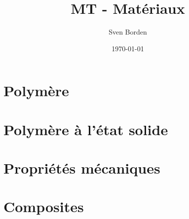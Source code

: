 \documentclass[12pt]{report}
\title{MT - Matériaux}
\author{Sven Borden}
\date{\today}
\begin{document}
	\maketitle	
	\tableofcontents
	\clearpage

	\chapter{Polymère}	
	
	\chapter{Polymère à l'état solide}
	
	\chapter{Propriétés mécaniques}
	
	\chapter{Composites}
	
\end{document}
